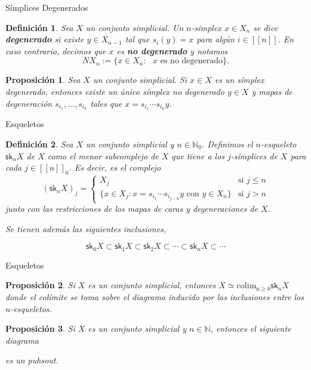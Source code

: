 \documentclass[11pt]{beamer}
\newcommand{\N}{\mathbb{N}}
\newcommand{\nat}[1]{[\![#1]\!]}
\newcommand{\ord}[1]{\nat{#1}}
\newcommand{\natzero}[1]{\nat{#1}_0}
\newcommand{\sk}{\mathsf{sk}}
\renewcommand{\ss}[1]{\Delta^{#1}}
\newtheorem{defs}{Definición}
\newtheorem{prop}{Proposición}
\begin{document}
\begin{frame}{Símplices Degenerados}
\begin{defs} Sea $X$ un conjunto simplicial. Un $n$-simplex $x \in X_n$ se dice \textbf{degenerado} si existe $y \in X_{n-1}$ tal que $s_i(y) = x$ para algún $i \in \ord{n}$. En caso contrario, decimos que $x$ es \textbf{no degenerado} y notamos 
\[
NX_n := \{x \in X_n : \text{ $x$ es no degenerado}\}.
\]
\end{defs}

\begin{prop} Sea $X$ un conjunto simplicial. Si $x \in X$ es un símplex degenerado, entonces existe un único símplex no degenerado $y \in X$ y mapas de degeneración $s_{i_1},\dots, s_{i_k}$ tales que $x = s_{i_1} \cdots s_{i_k}y$.
\end{prop}
\end{frame}

\begin{frame}{Esqueletos}
\begin{defs} Sea $X$ un conjunto simplicial y $n \in \N_0$. Definimos el $n$-esqueleto $\sk_n X$ de $X$ como el menor subcomplejo de $X$ que tiene a los $j$-símplices de $X$ para cada $j \in \natzero{n}$. Es decir, es el complejo
\[
(\sk_nX)_j = \begin{cases}
X_j &\text{si $j \leq n$}\\
\{x \in X_j : x = s_{i_1} \cdots s_{i_{j-n}}y \text{ con } y \in X_n\} &\text{si $j > n$}
\end{cases}
\]
junto con las restricciones de los mapas de caras y degeneraciones de $X$. 

Se tienen además las siguientes inclusiones,
\end{defs}
\[
\sk_0X \subset \sk_1X \subset \sk_2X \subset \cdots \subset \sk_nX \subset \cdots
\]
\end{frame}

\begin{frame}{Esqueletos}
\begin{prop} Si $X$ es un conjunto simplicial, entonces $X \simeq \operatorname{colim_{n \geq 0}} \sk_nX$ donde el colímite se toma sobre el diagrama inducido por las inclusiones entre los $n$-esqueletos.
\end{prop}
\begin{prop} Si $X$ es un conjunto simplicial y $n \in \N$, entonces el siguiente diagrama
\begin{center}
\end{center}
es un puhsout.
\end{prop}
\end{frame}
\end{document}
